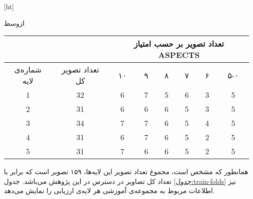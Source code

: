 [ht]

\vspace{1.5em}

‌ازوسط

\begin{tabular}{cccccccc}
    \cline{3-8}
                                                               &                                        & \multicolumn{6}{c}{تعداد تصویر بر حسب امتیاز ASPECTS}                                                                                \\ \hline
     
    {شماره‌ی لایه} & تعداد تصویر کل & {۱۰} & {۹} & {۸} & {۷} & {۶} & ۵-۰ \\ \hline
    {1}                                    & 32                                     & {6}                          & {7}                         & {5}                         & {6}                         & {3}                         & 5   \\ 
    {2}                                    & 31                                     & {6}                          & {6}                         & {6}                         & {5}                         & {3}                         & 5   \\ 
    {3}                                    & 34                                     & {7}                          & {7}                         & {6}                         & {5}                         & {4}                         & 5   \\ 
    {4}                                    & 31                                     & {6}                          & {7}                         & {6}                         & {5}                         & {2}                         & 5   \\ 
    {5}                                    & 31                                     & {7}                          & {6}                         & {6}                         & {5}                         & {2}                         & 5   \\ \hline
    \end{tabular}


همانطور که مشخص است، مجموع تعداد تصویر این لایه‌ها، ۱۵۹ تصویر است که برابر با تعداد کل تصاویر در دسترس در این پژوهش می‌باشد.
جدول \ref{جدول:train-folds} نیز
اطلاعات مربوط به مجموعه‌ی آموزشی هر لایه‌ی ارزیابی را نمایش می‌دهد.

